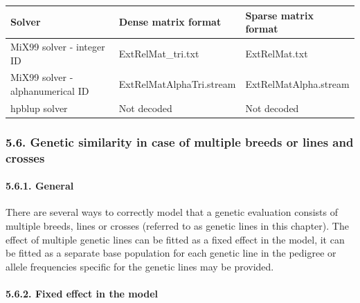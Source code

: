 {\def\LTcaptype{none} %
\begin{longtable}[]{@{}
  >{\raggedright\arraybackslash}p{}
  >{\raggedright\arraybackslash}p{}
  >{\raggedright\arraybackslash}p{}@{}}
\toprule\noalign{}
\begin{minipage}[b]{\linewidth}\raggedright
Solver
\end{minipage} & \begin{minipage}[b]{\linewidth}\raggedright
Dense matrix format
\end{minipage} & \begin{minipage}[b]{\linewidth}\raggedright
Sparse matrix format
\end{minipage} \\
\midrule\noalign{}
\endhead
\bottomrule\noalign{}
\endlastfoot
MiX99 solver - integer ID & ExtRelMat\_tri.txt & ExtRelMat.txt \\
MiX99 solver - alphanumerical ID & ExtRelMatAlphaTri.stream &
ExtRelMatAlpha.stream \\
hpblup solver & Not decoded & Not decoded \\
\end{longtable}
}

\subsubsection{5.6. Genetic similarity in case of multiple breeds or
lines and crosses}\label{Gene58}

\paragraph{5.6.1. General}\label{Gene59}

There are several ways to correctly model that a genetic evaluation
consists of multiple breeds, lines or crosses (referred to as genetic
lines in this chapter). The effect of multiple genetic lines can be
fitted as a fixed effect in the model, it can be fitted as a separate
base population for each genetic line in the pedigree or allele
frequencies specific for the genetic lines may be provided.

\paragraph{5.6.2. Fixed effect in the model}\label{Gene60}

